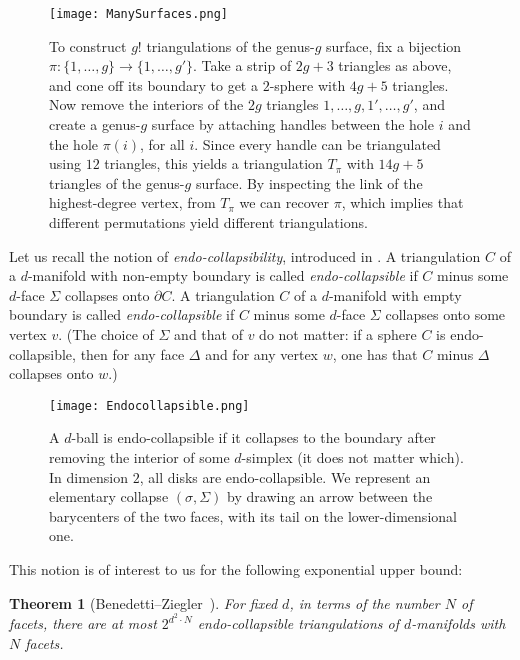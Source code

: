 \documentclass[a4paper,11pt]{article}
\theoremstyle{plain}
\newtheorem{theorem}{\bf Theorem}[section]
\theoremstyle{definition}
\begin{document}
\begin{figure}[hbtp]  \centering
\texttt{[image: ManySurfaces.png]} 
\caption{To construct $g!$ triangulations of the genus-$g$ surface, fix a bijection $\pi: \{1, \ldots, g\} \rightarrow \{1, \ldots, g'\}$. Take a strip of $2g+3$ triangles as above, and cone off its boundary to get a $2$-sphere with $4g+5$ triangles. Now remove the interiors of the $2g$ triangles $1, \ldots, g, 1', \ldots, g'$, and create a genus-$g$ surface by attaching handles between the hole $i$ and the hole $\pi(i)$, for all $i$. Since every handle can be triangulated using $12$ triangles, this yields a triangulation $T_{\pi}$  with $14g+5$ triangles of the genus-$g$ surface. By inspecting the link of the highest-degree vertex, from $T_{\pi}$ we can recover $\pi$, which implies that different permutations yield different triangulations.\label{fig:3}}	\end{figure}

Let us recall the notion of {\it endo-collapsibility}, introduced in \cite{Benedetti-DMT4MWB}. A triangulation $C$ of a $d$-manifold with non-empty boundary is called \emph{endo-collapsible} if $C$ minus some $d$-face $\Sigma$ collapses onto $\partial C$. A triangulation $C$ of a $d$-manifold with empty boundary is called \emph{endo-collapsible} if $C$ minus some $d$-face $\Sigma$ collapses onto some vertex $v$. (The choice of $\Sigma$ and that of $v$ do not matter: if a sphere $C$ is endo-collapsible, then for any face $\Delta$ and for any vertex $w$, one has that $C$ minus $\Delta$ collapses onto $w$.)  

\begin{figure}[hbtp] 	\centering
\texttt{[image: Endocollapsible.png]} 
\caption{A $d$-ball is endo-collapsible if it collapses to the boundary after removing the interior of some $d$-simplex (it does not matter which). In dimension $2$, all disks are endo-collapsible. We represent an elementary collapse $(\sigma, \Sigma)$ by drawing an arrow between the barycenters of the two faces, with its tail on the lower-dimensional one. 
}
\end{figure}



This notion is of interest to us for the following exponential upper bound:

\begin{theorem}[Benedetti--Ziegler~{\cite{BZ}}]\label{thm:ENDOexpbound}
For fixed $d$, in terms of the number $N$ of facets, there are at most $2^{d^2 \cdot N}$ endo-collapsible triangulations of $d$-manifolds with $N$ facets.
\end{theorem}
\end{document}
